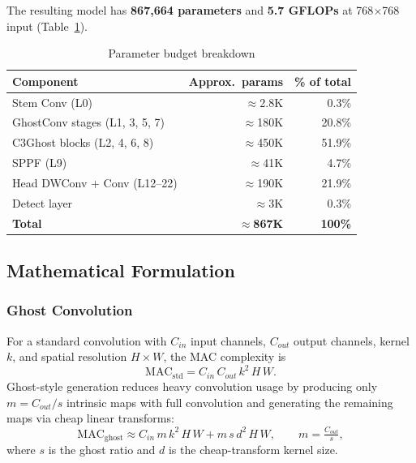 \documentclass[11pt,a4paper]{article}
\begin{document}
The resulting model has \textbf{867,664 parameters} and \textbf{5.7 GFLOPs} at
768$\times$768 input (Table~\ref{tab:param_budget}).

\begin{table}[H]
\centering
\caption{Parameter budget breakdown}
\label{tab:param_budget}
\begin{tabular}{lrr}
\toprule
\textbf{Component}                   & \textbf{Approx.\ params} & \textbf{\% of total} \\
\midrule
Stem Conv (L0)                        & $\approx$2.8K  &  0.3\% \\
GhostConv stages (L1, 3, 5, 7)       & $\approx$180K  & 20.8\% \\
C3Ghost blocks (L2, 4, 6, 8)         & $\approx$450K  & 51.9\% \\
SPPF (L9)                             & $\approx$41K   &  4.7\% \\
Head DWConv + Conv (L12--22)          & $\approx$190K  & 21.9\% \\
Detect layer                          & $\approx$3K    &  0.3\% \\
\midrule
\textbf{Total}                        & \textbf{$\approx$867K} & \textbf{100\%} \\
\bottomrule
\end{tabular}
\end{table}

\subsection{Mathematical Formulation}

\subsubsection{Ghost Convolution}

For a standard convolution with $C_{in}$ input channels, $C_{out}$ output channels,
kernel $k$, and spatial resolution $H\!\times\!W$, the MAC complexity is
\begin{equation}
  \mathrm{MAC}_{\mathrm{std}} = C_{in}\,C_{out}\,k^2\,H\,W.
\end{equation}
Ghost-style generation reduces heavy convolution usage by producing only $m = C_{out}/s$
intrinsic maps with full convolution and generating the remaining maps via cheap linear
transforms:
\begin{equation}
  \mathrm{MAC}_{\mathrm{ghost}} \approx C_{in}\,m\,k^2\,H\,W + m\,s\,d^2\,H\,W,
  \qquad m = \tfrac{C_{out}}{s},
\end{equation}
where $s$ is the ghost ratio and $d$ is the cheap-transform kernel size.
\end{document}
